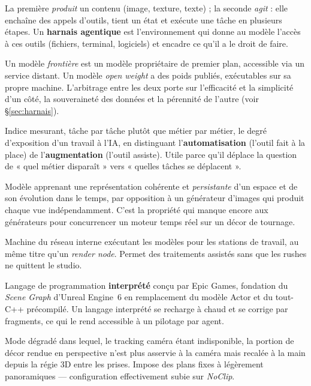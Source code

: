 \documentclass[11pt,a4paper]{report}
\begin{document}
\begin{description}[leftmargin=3.4cm,style=nextline,font=\bfseries\color{braccent}]
\item[IA générative / IA agentique] La première \emph{produit} un contenu (image, texture, texte) ; la seconde \emph{agit} : elle enchaîne des appels d'outils, tient un état et exécute une tâche en plusieurs étapes. Un \textbf{harnais agentique} est l'environnement qui donne au modèle l'accès à ces outils (fichiers, terminal, logiciels) et encadre ce qu'il a le droit de faire.
\item[Modèle frontière / modèle \emph{open weight}] Un modèle \emph{frontière} est un modèle propriétaire de premier plan, accessible via un service distant. Un modèle \emph{open weight} a des poids publiés, exécutables sur sa propre machine. L'arbitrage entre les deux porte sur l'efficacité et la simplicité d'un côté, la souveraineté des données et la pérennité de l'autre (voir §\ref{sec:harnais}).
\item[\emph{AI Exposure Index}] Indice mesurant, tâche par tâche plutôt que métier par métier, le degré d'exposition d'un travail à l'IA, en distinguant l'\textbf{automatisation} (l'outil fait à la place) de l'\textbf{augmentation} (l'outil assiste). Utile parce qu'il déplace la question de « quel métier disparaît » vers « quelles tâches se déplacent ».
\item[\emph{World model}] Modèle apprenant une représentation cohérente et \emph{persistante} d'un espace et de son évolution dans le temps, par opposition à un générateur d'images qui produit chaque vue indépendamment. C'est la propriété qui manque encore aux générateurs pour concurrencer un moteur temps réel sur un décor de tournage.
\item[Serveur d'inférence local] Machine du réseau interne exécutant les modèles pour les stations de travail, au même titre qu'un \emph{render node}. Permet des traitements assistés sans que les rushes ne quittent le studio.
\item[Verse] Langage de programmation \textbf{interprété} conçu par Epic Games, fondation du \emph{Scene Graph} d'Unreal Engine~6 en remplacement du modèle Actor et du tout-C++ précompilé. Un langage interprété se recharge à chaud et se corrige par fragments, ce qui le rend accessible à un pilotage par agent.
\item[Frustum manuel] Mode dégradé dans lequel, le tracking caméra étant indisponible, la portion de décor rendue en perspective n'est plus asservie à la caméra mais recalée à la main depuis la régie 3D entre les prises. Impose des plans fixes à légèrement panoramiques --- configuration effectivement subie sur \textit{NoClip}.
\end{description}

\cleardoublepage
\renewcommand{\bibname}{Bibliographie}
\nocite{*}
\printbibliography[heading=bibintoc,title={Bibliographie}]
\end{document}
